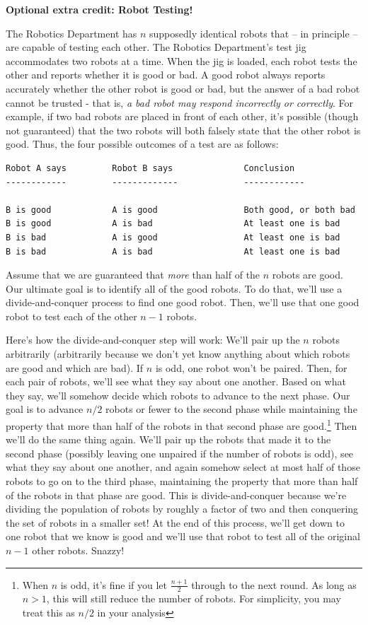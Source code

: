 \documentclass[11pt,addpoints,answers]{exam}
\theoremstyle{plain}            %
\theoremstyle{definition}       %
\theoremstyle{remark}           %
\begin{document}
\begin{questions}
\bonusquestion[3] \textbf{Optional extra credit: Robot Testing!} 

The Robotics Department has $n$ supposedly identical robots that  -- in principle -- are capable of testing each other.  The Robotics Department's test jig accommodates two robots at a time. When the jig is loaded, each robot tests the other and reports whether it is good or bad. A good robot always reports accurately whether the other robot is good or bad, but the answer of a bad robot cannot be trusted - that is, \textit{a bad robot may respond incorrectly or correctly}. For example, if two bad robots are placed in front of each other, it's possible (though not guaranteed) that the two robots will both falsely state that the other robot is good. Thus, the four possible outcomes of a test are as follows:

\begin{verbatim}
Robot A says         Robot B says              Conclusion
------------         -------------             ------------

B is good            A is good                 Both good, or both bad
B is good            A is bad                  At least one is bad
B is bad             A is good                 At least one is bad
B is bad             A is bad                  At least one is bad
\end{verbatim}

Assume that we are guaranteed that \emph{more} than half of the $n$ robots are good.  Our ultimate goal is to identify all of the good robots.  To do that, we'll use a divide-and-conquer process to find one good robot.  Then, we'll use that one good robot to test each of the other $n-1$ robots.

 Here's how the divide-and-conquer step will work: We'll pair up the $n$ robots arbitrarily (arbitrarily because we don't yet know anything about 
which robots are good and which are bad).  If $n$ is odd, one robot won't be paired.  Then, for each pair of robots, we'll see what they say about one another.  Based on what they say, we'll somehow decide which robots to advance to the next phase.  Our goal is to advance $n/2$ robots  or fewer to the second phase while maintaining the property that more than half of the robots in that second phase are good.\footnote{When $n$ is odd, it's fine if you let $\frac{n+1}2$ through to the next round.  As long as $n>1$, this will still reduce the number of robots.  For simplicity, you may treat this as $n/2$ in your analysis}
Then we'll do the same thing again.
We'll pair up the robots that made it to the second phase (possibly leaving one unpaired if the number of robots is odd), see what they say about one another, and again somehow select at most half of those robots to go on to the third phase, maintaining the property that more than half of the robots in that phase are good.  This is divide-and-conquer because we're dividing the population of robots by roughly a factor of two and then conquering the set of robots in a smaller set!  At the end of this process, we'll get down to one robot that we know is good and we'll use that robot to test all of the original $n-1$ other robots.  Snazzy!


\end{questions}
\end{document}
